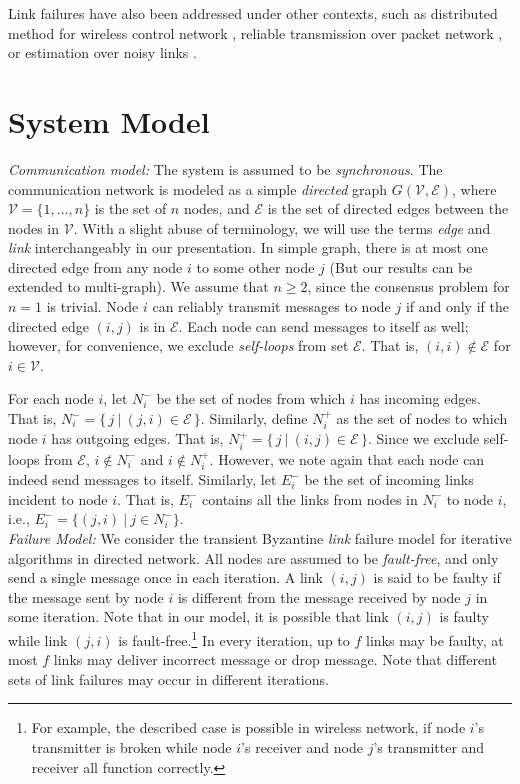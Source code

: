 \documentclass{llncs}
\newcommand{\scripte}{\mathcal{E}}
\newcommand{\scriptv}{\mathcal{V}}
\begin{document}
Link failures have also been addressed under other contexts, such as distributed method for wireless control network \cite{control}, reliable transmission over packet network \cite{packet}, or estimation over noisy links \cite{noisy_link}.

\section{System Model}
\label{s_models}


{\em Communication model:}
The system is assumed to be {\em synchronous}. The communication network is modeled as a simple {\em directed} graph $G(\scriptv,\scripte)$, where $\scriptv=\{1,\dots,n\}$ is the set of $n$ nodes, and $\scripte$ is the set of directed edges between the nodes in $\scriptv$.
With a slight abuse of terminology, we will use the terms {\em edge}
and {\em link} interchangeably in our presentation.
In simple graph, there is at most one directed edge from any node $i$ to some other node $j$ (But our results can be extended to multi-graph).
We assume that $n\geq 2$, since the consensus problem for $n=1$ is trivial.
Node $i$ can reliably transmit messages to node $j$ if and only if
the directed edge $(i,j)$ is in $\scripte$.
Each node can send messages to itself as well; however,
for convenience, we exclude {\em self-loops} from set $\scripte$.
That is, $(i,i)\not\in\scripte$ for $i\in\scriptv$.




For each node $i$, let $N_i^-$ be the set of nodes from which $i$ has incoming edges.
That is, $N_i^- = \{\, j ~|~ (j,i)\in \scripte\, \}$.
Similarly, define $N_i^+$ as the set of nodes to which node $i$
has outgoing edges. That is, $N_i^+ = \{\, j ~|~ (i,j)\in \scripte\, \}$.
Since we exclude self-loops from $\scripte$,
$i\not\in N_i^-$ and $i\not\in N_i^+$. 
However, we note again that each node can indeed send messages to itself. Similarly, let $E_i^-$ be the set of incoming links incident to node $i$. That is, $E_i^-$ contains all the links from nodes in $N_i^-$ to node $i$, i.e., $E_i^- = \{(j,i)~|~j \in N_i^-\}$.\\


{\em Failure Model:}
We consider the transient Byzantine {\em link} failure model \cite{Santoro_link,Santoro_link2} for iterative algorithms in directed network. All nodes are assumed to be {\em fault-free}, and only send a single message once in each iteration. 
A link $(i,j)$ is said to be faulty if the message sent by node $i$ is different from the message received by node $j$ in some iteration. Note that in our model, it is possible that link $(i,j)$ is faulty while link $(j,i)$ is fault-free.\footnote{For example, the described case is possible in wireless network, if node $i$'s transmitter is broken while node $i$'s receiver and node $j$'s transmitter and receiver all function correctly.} In every iteration, up to $f$ links may be faulty, at most $f$ links may deliver incorrect message or drop message. Note that different sets of link failures may occur in different iterations.
\end{document}
